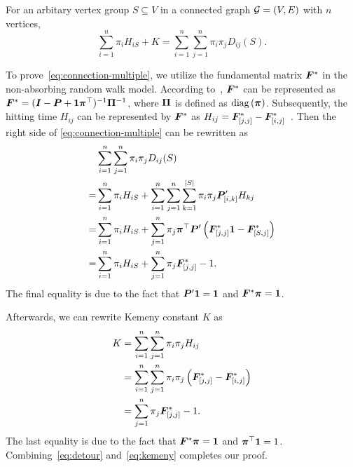 \documentclass[journal]{IEEEtran}
\begin{document}
\begin{theorem}\label{thm:connection-multiple}
    For an arbitary vertex group \(S\subseteq V\) in a connected graph \(\mathcal{G}=(V,E)\) with \(n\) vertices,
    \begin{equation}\label{eq:connection-multiple}
        \sum_{i=1}^n\pi_iH_{iS}+K=\sum_{i=1}^n\sum_{j=1}^n\pi_i\pi_jD_{ij}(S).
    \end{equation}
\end{theorem}
\begin{IEEEproof}
    To prove~\eqref{eq:connection-multiple}, we utilize the fundamental matrix \(\boldsymbol{F}^*\) in the non-absorbing random walk model.
    According to~\cite{BoRaZh11}, \(\boldsymbol{F}^*\) can be represented as \(\boldsymbol{F}^*=(\boldsymbol{I}-\boldsymbol{P}+\boldsymbol{1}\boldsymbol{\pi}^\top)^{-1}\boldsymbol{\Pi}^{-1}\), where \(\boldsymbol{\Pi}\) is defined as \(\rm{diag}\left( \boldsymbol{\pi} \right)\).
    Subsequently, the hitting time \(H_{ij}\) can be represented by \(\boldsymbol{F}^*\) as \(H_{ij}=\boldsymbol{F}^*_{[j,j]}-\boldsymbol{F}^*_{[i,j]}\)~\cite{BoRaZh11}.
    Then the right side of \eqref{eq:connection-multiple} can be rewritten as
    \begin{equation}\label{eq:detour}
        \begin{split}
            &\sum_{i=1}^n\sum_{j=1}^n\pi_i\pi_jD_{ij}(S)\\
            =&\sum_{i=1}^n\pi_i H_{iS}+\sum_{i=1}^n\sum_{j=1}^n\sum_{k=1}^{\left|S \right|}\pi_i\pi_j\boldsymbol{P}'_{[i,k]}H_{kj}  \\
            =&\sum_{i=1}^n\pi_i H_{iS}+\sum_{j=1}^n\pi_j\boldsymbol{\pi}^\top\boldsymbol{P}'\left( \boldsymbol{F}^*_{[j,j]}\boldsymbol{1}-\boldsymbol{F}^*_{[S,j]} \right)                        \\
            =&\sum_{i=1}^n\pi_i H_{iS}+\sum_{j=1}^n\pi_j\boldsymbol{F}^*_{[j,j]}-1.
        \end{split}
    \end{equation}
    The final equality is due to the fact that \(\boldsymbol{P}'\boldsymbol{1}=\boldsymbol{1}\) and \(\boldsymbol{F}^*\boldsymbol{\pi}=\boldsymbol{1}\).

    Afterwards, we can rewrite Kemeny constant \(K\) as
    \begin{equation}\label{eq:kemeny}
        \begin{split}
            K&=\sum_{i=1}^n\sum_{j=1}^n\pi_i\pi_jH_{ij}\\
            &=\sum_{i=1}^n\sum_{j=1}^n\pi_i\pi_j\left( \boldsymbol{F}^*_{[j,j]}-\boldsymbol{F}^*_{[i,j]} \right)\\
            &=\sum_{j=1}^n\pi_j\boldsymbol{F}^*_{[j,j]}-1.
        \end{split}
    \end{equation}
    The last equality is due to the fact that \(\boldsymbol{F}^*\boldsymbol{\pi}=\boldsymbol{1}\) and \(\boldsymbol{\pi}^\top\boldsymbol{1}=1\).
    Combining~\eqref{eq:detour} and~\eqref{eq:kemeny} completes our proof.
\end{IEEEproof}
\end{document}
